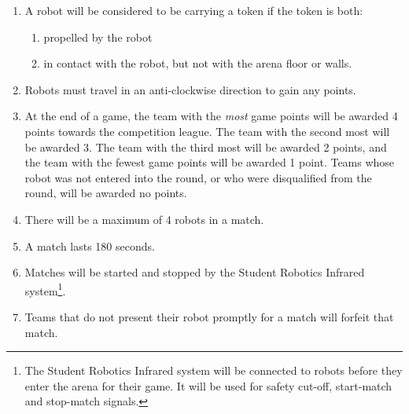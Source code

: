 \begin{enumerate}
\item A robot will be considered to be carrying a token if the token is both:
  \begin{enumerate}
  \item propelled by the robot
  \item in contact with the robot, but not with the arena floor or walls.
  \end{enumerate}

\item Robots must travel in an anti-clockwise direction to gain any points.

\item At the end of a game, the team with the \emph{most} game points will be awarded 4 points towards the competition league.
 The team with the second most will be awarded 3.
 The team with the third most will be awarded 2 points, and the team with the fewest game points will be awarded 1 point.
 Teams whose robot was not entered into the round, or who were disqualified from the round, will be awarded no points.

\item There will be a maximum of 4 robots in a match.
\item A match lasts 180 seconds.
\item Matches will be started and stopped by the Student Robotics Infrared system\footnote{The Student Robotics Infrared system will be connected to robots before they enter the arena for their game.  It will be used for safety cut-off, start-match and stop-match signals.}.
\item Teams that do not present their robot promptly for a match will forfeit that match.
\end{enumerate}
